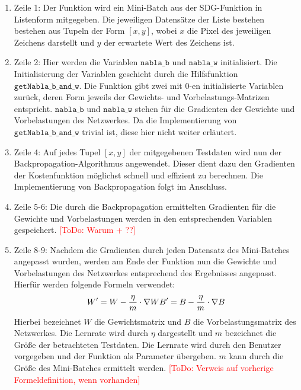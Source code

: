 \begin{enumerate}
\item Zeile 1: Der Funktion wird ein Mini-Batch aus der SDG-Funktion in Listenform mitgegeben. Die jeweiligen Datensätze der Liste bestehen bestehen aus Tupeln der Form $[x,y]$, wobei $x$ die Pixel des jeweiligen Zeichens darstellt und $y$ der erwartete Wert des Zeichens ist.
\item Zeile 2: Hier werden die Variablen $\mathtt{nabla\_b}$ und $\mathtt{nabla\_w}$ initialisiert. Die Initialisierung der Variablen geschieht durch die Hilfsfunktion $\mathtt{getNabla\_b\_and\_w}$. Die Funktion gibt zwei mit 0-en initialisierte Variablen zurück, deren Form jeweils der Gewichts- und Vorbelastungs-Matrizen entspricht. $\mathtt{nabla\_b}$ und $\mathtt{nabla\_w}$ stehen für die Gradienten der Gewichte und Vorbelastungen des Netzwerkes. Da die Implementierung von $\mathtt{getNabla\_b\_and\_w}$ trivial ist, diese hier nicht weiter erläutert.
\item Zeile 4: Auf jedes Tupel $[x,y]$ der mitgegebenen Testdaten wird nun der Backpropagation-Algorithmus angewendet. Dieser dient dazu den Gradienten der Kostenfunktion möglichst schnell und effizient zu berechnen. Die Implementierung von Backpropagation folgt im Anschluss.
\item Zeile 5-6: Die durch die Backpropagation ermittelten Gradienten für die Gewichte und Vorbelastungen werden in den entsprechenden Variablen gespeichert. \textcolor{red}{[ToDo: Warum + ??]}
\item Zeile 8-9: Nachdem die Gradienten durch jeden Datensatz des Mini-Batches angepasst wurden, werden am Ende der Funktion nun die Gewichte und Vorbelastungen des Netzwerkes entsprechend des Ergebnisses angepasst. Hierfür werden folgende Formeln verwendet:
\begin{equation}
	W' = W - \frac{\eta}{m}\cdot \nabla W \\
	B' = B - \frac{\eta}{m}\cdot \nabla B
\end{equation}
Hierbei bezeichnet $W$ die Gewichtsmatrix und $B$ die Vorbelastungsmatrix des Netzwerkes. Die Lernrate wird durch $\eta$ dargestellt und $m$ bezeichnet die Größe der betrachteten Testdaten. Die Lernrate wird durch den Benutzer vorgegeben und der Funktion als Parameter übergeben. $m$ kann durch die Größe des Mini-Batches ermittelt werden. \textcolor{red}{[ToDo: Verweis auf vorherige Formeldefinition, wenn vorhanden]}
\end{enumerate}

